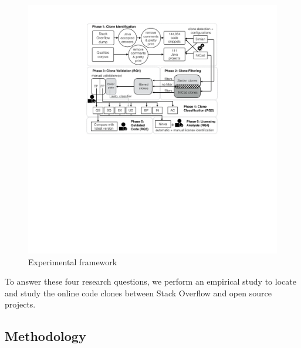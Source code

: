 \documentclass[sigconf,review, anonymous]{acmart}
\begin{document}
\begin{figure}
  \centering
  \includegraphics[width=\linewidth]{exp_framework_new}
  \caption{Experimental framework}
  \label{fig:exp_framework}
\end{figure}

To answer these four research questions, we perform an empirical study to
locate and study the online code clones between Stack Overflow and open source
projects. 



\subsection{Methodology}
\end{document}
